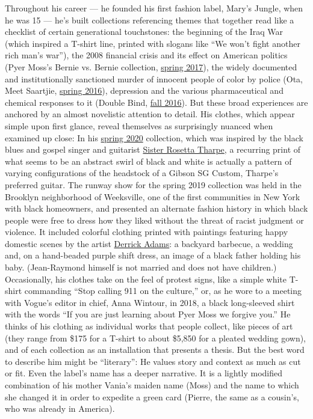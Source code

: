 Throughout his career --- he founded his first fashion label, Mary's
Jungle, when he was 15 --- he's built collections referencing themes
that together read like a checklist of certain generational touchstones:
the beginning of the Iraq War (which inspired a T-shirt line, printed
with slogans like ``We won't fight another rich man's war''), the 2008
financial crisis and its effect on American politics (Pyer Moss's Bernie
vs. Bernie collection,
\href{https://www.vogue.com/fashion-shows/spring-2017-ready-to-wear/pyer-moss}{spring
2017}), the widely documented and institutionally sanctioned murder of
innocent people of color by police (Ota, Meet Saartjie,
\href{https://www.nytimes3xbfgragh.onion/interactive/2016/02/08/fashion/Designers-On-the-Rise-at-New-York-Fashion-Week.html}{spring
2016}), depression and the various pharmaceutical and chemical responses
to it (Double Bind,
\href{https://www.vogue.com/fashion-shows/fall-2016-menswear/pyer-moss}{fall
2016}). But these broad experiences are anchored by an almost novelistic
attention to detail. His clothes, which appear simple upon first glance,
reveal themselves as surprisingly nuanced when examined up close: In his
\href{https://www.nytimes3xbfgragh.onion/2019/09/07/t-magazine/new-york-fashion-week-pictures.html}{spring
2020} collection, which was inspired by the black blues and gospel
singer and guitarist
\href{https://www.nytimes3xbfgragh.onion/1973/10/10/archives/sister-rosetta-tharpe-is-dead-top-gospel-singer-since-1930.html}{Sister
Rosetta Tharpe}, a recurring print of what seems to be an abstract swirl
of black and white is actually a pattern of varying configurations of
the headstock of a Gibson SG Custom, Tharpe's preferred guitar. The
runway show for the spring 2019 collection was held in the Brooklyn
neighborhood of Weeksville, one of the first communities in New York
with black homeowners, and presented an alternate fashion history in
which black people were free to dress how they liked without the threat
of racist judgment or violence. It included colorful clothing printed
with paintings featuring happy domestic scenes by the artist
\href{https://www.nytimes3xbfgragh.onion/2019/11/05/t-magazine/derrick-adams.html}{Derrick
Adams}: a backyard barbecue, a wedding and, on a hand-beaded purple
shift dress, an image of a black father holding his baby. (Jean-Raymond
himself is not married and does not have children.) Occasionally, his
clothes take on the feel of protest signs, like a simple white T-shirt
commanding ``Stop calling 911 on the culture,'' or, as he wore to a
meeting with Vogue's editor in chief, Anna Wintour, in 2018, a black
long-sleeved shirt with the words ``If you are just learning about Pyer
Moss we forgive you.'' He thinks of his clothing as individual works
that people collect, like pieces of art (they range from \$175 for a
T-shirt to about \$5,850 for a pleated wedding gown), and of each
collection as an installation that presents a thesis. But the best word
to describe him might be ``literary'': He values story and context as
much as cut or fit. Even the label's name has a deeper narrative. It is
a lightly modified combination of his mother Vania's maiden name (Moss)
and the name to which she changed it in order to expedite a green card
(Pierre, the same as a cousin's, who was already in America).

